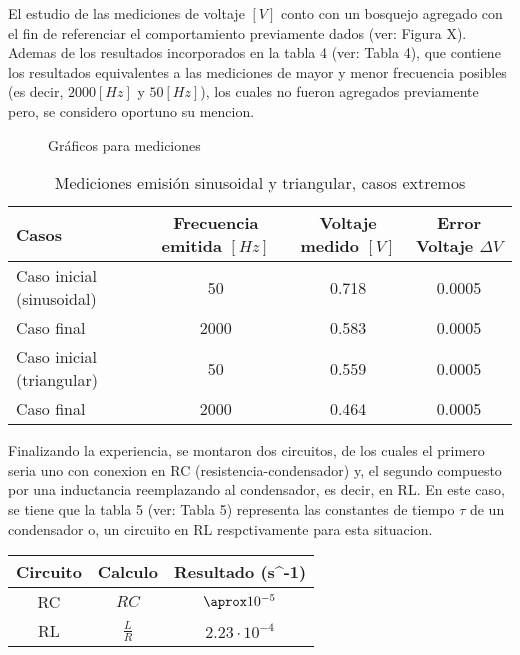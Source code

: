 El estudio de las mediciones de voltaje $[V]$ conto con un bosquejo agregado con el fin de referenciar el
comportamiento previamente dados (ver: Figura X). Ademas de los resultados incorporados en la tabla 4
(ver: Tabla 4), que contiene los resultados equivalentes a las mediciones de mayor y menor frecuencia posibles
(es decir, $2000[Hz]$ y $50[Hz]$), los cuales no fueron agregados previamente pero, se considero oportuno su mencion.
{
\begin{figure}[h!]
    \centering
    \caption{Gráficos para mediciones}
    \label{fig:enter-label}
\end{figure}

\begin{table}[h!]
    \begin{tabular}{|l|c|c|c|}
     \hline
     Casos & Frecuencia emitida $[Hz]$ & Voltaje medido $[V]$ & Error Voltaje $\Delta V$  \\ \hline
     Caso inicial (sinusoidal) & 50 & 0.718 & 0.0005 \\
     Caso final  & 2000 & 0.583 & 0.0005 \\ \hline
     Caso inicial (triangular) & 50 & 0.559 & 0.0005 \\
     Caso final  & 2000 & 0.464 & 0.0005 \\\hline
    \end{tabular}
    \caption{Mediciones emisión sinusoidal y triangular, casos extremos}
\end{table}
}

Finalizando la experiencia, se montaron dos circuitos, de los cuales el primero seria uno con conexion en RC
(resistencia-condensador) y, el segundo compuesto por una inductancia reemplazando al condensador, es decir, en RL.
En este caso, se tiene que la tabla 5 (ver: Tabla 5) representa las constantes de tiempo $\tau$ de un condensador o,
un circuito en RL respctivamente para esta situacion.
\begin{table}
    \begin{tabular}{|c|c|c|}
        \hline
        Circuito & Calculo & Resultado (s^{-1})\\ \hline
        RC & $RC$ & $\aprox 10^{-5}$\\
        RL & $\frac{L}{R}$ & $2.23\cdot 10^{-4}$ \\
    \end{tabular} \\
\end{table}


